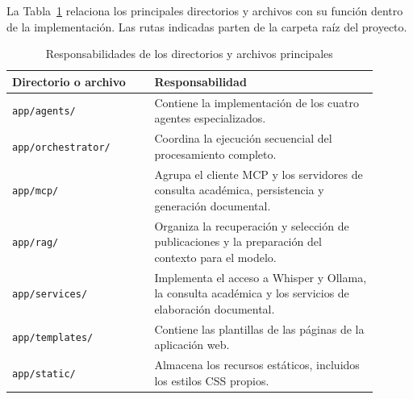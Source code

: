 La Tabla~\ref{tab:responsabilidades-directorios}
relaciona los principales directorios y archivos
con su función dentro de la implementación.
Las rutas indicadas parten de la carpeta raíz
del proyecto.

\begin{table}[H]
    \centering
    \caption{Responsabilidades de los directorios y archivos principales}
    \label{tab:responsabilidades-directorios}

    \begingroup
    \footnotesize
    \setlength{\tabcolsep}{5pt}
    \setlength{\parskip}{0pt}
    \renewcommand{\arraystretch}{1.1}

    \begin{tabular}{
        |>{\raggedright\arraybackslash}p{0.35\linewidth}
        |>{\raggedright\arraybackslash}p{0.55\linewidth}|
    }
        \hline
        \textbf{Directorio o archivo} &
        \textbf{Responsabilidad} \\
        \hline

        \texttt{app/agents/} &
        Contiene la implementación de los cuatro
        agentes especializados. \\
        \hline

        \texttt{app/orchestrator/} &
        Coordina la ejecución secuencial
        del procesamiento completo. \\
        \hline

        \texttt{app/mcp/} &
        Agrupa el cliente MCP y los servidores
        de consulta académica, persistencia
        y generación documental. \\
        \hline

        \texttt{app/rag/} &
        Organiza la recuperación y selección
        de publicaciones y la preparación
        del contexto para el modelo. \\
        \hline

        \texttt{app/services/} &
        Implementa el acceso a Whisper y Ollama,
        la consulta académica y los servicios
        de elaboración documental. \\
        \hline

        \texttt{app/templates/} &
        Contiene las plantillas de las páginas
        de la aplicación web. \\
        \hline

        \texttt{app/static/} &
        Almacena los recursos estáticos,
        incluidos los estilos CSS propios. \\
        \hline


\end{tabular}
\end{table}
